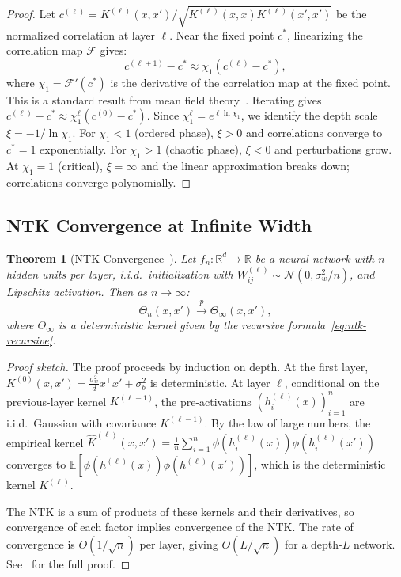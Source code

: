 \documentclass[10pt]{article}
\newtheorem{theorem}{Theorem}[section]
\theoremstyle{definition}
\begin{document}
\begin{proof}
Let $c^{(\ell)} = K^{(\ell)}(x, x') / \sqrt{K^{(\ell)}(x,x) K^{(\ell)}(x',x')}$ be the normalized correlation at layer $\ell$.
Near the fixed point $c^*$, linearizing the correlation map $\mathcal{F}$ gives:
\begin{equation}
  c^{(\ell+1)} - c^* \approx \chi_1 (c^{(\ell)} - c^*),
\end{equation}
where $\chi_1 = \mathcal{F}'(c^*)$ is the derivative of the correlation map at the fixed point.
This is a standard result from mean field theory~\citep{schoenholz2017deep}.
Iterating gives $c^{(\ell)} - c^* \approx \chi_1^\ell (c^{(0)} - c^*)$.
Since $\chi_1^\ell = e^{\ell \ln \chi_1}$, we identify the depth scale $\xi = -1/\ln\chi_1$.
For $\chi_1 < 1$ (ordered phase), $\xi > 0$ and correlations converge to $c^* = 1$ exponentially.
For $\chi_1 > 1$ (chaotic phase), $\xi < 0$ and perturbations grow.
At $\chi_1 = 1$ (critical), $\xi = \infty$ and the linear approximation breaks down; correlations converge polynomially.
\end{proof}

\subsection{NTK Convergence at Infinite Width}
\label{app:proof-ntk}

\begin{theorem}[NTK Convergence~\citep{jacot2018neural}]
\label{thm:ntk-convergence}
Let $f_n: \mathbb{R}^d \to \mathbb{R}$ be a neural network with $n$ hidden units per layer, i.i.d.\ initialization with $W_{ij}^{(\ell)} \sim \mathcal{N}(0, \sigma_w^2/n)$, and Lipschitz activation.
Then as $n \to \infty$:
\begin{equation}
  \Theta_n(x, x') \xrightarrow{p} \Theta_\infty(x, x'),
\end{equation}
where $\Theta_\infty$ is a deterministic kernel given by the recursive formula~\eqref{eq:ntk-recursive}.
\end{theorem}

\begin{proof}[Proof sketch]
The proof proceeds by induction on depth.
At the first layer, $K^{(0)}(x,x') = \frac{\sigma_w^2}{d} x^\top x' + \sigma_b^2$ is deterministic.
At layer $\ell$, conditional on the previous-layer kernel $K^{(\ell-1)}$, the pre-activations $(h_i^{(\ell)}(x))_{i=1}^n$ are i.i.d.\ Gaussian with covariance $K^{(\ell-1)}$.
By the law of large numbers, the empirical kernel $\hat{K}^{(\ell)}(x,x') = \frac{1}{n} \sum_{i=1}^n \phi(h_i^{(\ell)}(x)) \phi(h_i^{(\ell)}(x'))$ converges to $\mathbb{E}[\phi(h^{(\ell)}(x)) \phi(h^{(\ell)}(x'))]$, which is the deterministic kernel $K^{(\ell)}$.

The NTK is a sum of products of these kernels and their derivatives, so convergence of each factor implies convergence of the NTK.
The rate of convergence is $O(1/\sqrt{n})$ per layer, giving $O(L/\sqrt{n})$ for a depth-$L$ network.
See~\citet{jacot2018neural,yang2019scaling} for the full proof.
\end{proof}
\end{document}
